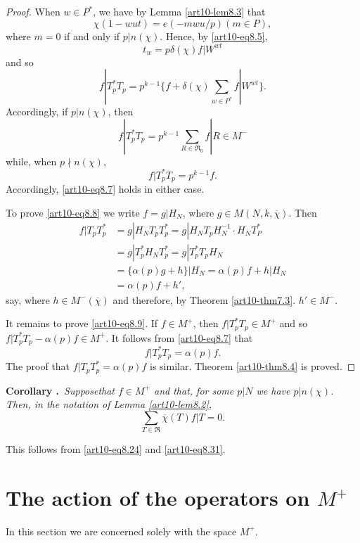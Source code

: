 \begin{proof}
When $w\in P^{*}$, we have by Lemma \ref{art10-lem8.3} that
$$
\chi(1-wut)=e(-mwu/p)(m\in P),
$$
where $m=0$ if and only if $p|n(\chi)$. Hence, by \eqref{art10-eq8.5},
$$
t_{w}=p\delta(\chi)f|W^{wt}
$$
and so
\begin{equation}
f|T^{*}_{p}T_{p}=p^{k-1}\{f+\delta(\chi)\sum\limits_{w\in P^{*}}f|W^{wt}\}.\label{art10-eq8.30}
\end{equation}
Accordingly, if $p|n(\chi)$, then
\begin{equation}
f|T^{*}_{p}T_{p}=p^{k-1}\sum\limits_{R\in \mathfrak{R}_{0}}f|R\in M^{-}\label{art10-eq8.31}
\end{equation}
while, when $p\nmid n(\chi)$,
\begin{equation}
f|T^{*}_{p}T_{p}=p^{k-1}f.\label{art10-eq8.32}
\end{equation}
Accordingly, \eqref{art10-eq8.7} holds in either case.

To prove \eqref{art10-eq8.8} we write $f=g|H_{N}$, where $g\in M(N,k,\overline{\chi})$. Then
\begin{align*}
f|T_{p}T^{*}_{p} &= g|H_{N}T_{p}T^{*}_{p}=g|H_{N}T_{p}H^{-1}_{N}\cdot H_{N}T^{*}_{P}\\
&= g|T^{*}_{p}H_{N}T^{*}_{p}=g|T^{*}_{p}T_{p}H_{N}\\
&= \{\alpha(p)g+h\}|H_{N}=\alpha(p)f+h|H_{N}\\
&= \alpha(p)f+h',
\end{align*}
say, where $h\in M^{-}(\overline{\chi})$ and therefore, by Theorem \ref{art10-thm7.3}. $h'\in M^{-}$.

It remains to prove \eqref{art10-eq8.9}. If $f\in M^{+}$, then $f|T^{*}_{p}T_{p}\in M^{+}$ and so $f|T^{*}_{p}T_{p}-\alpha(p)f\in M^{+}$. It follows from \eqref{art10-eq8.7} that
$$
f|T^{*}_{p}T_{p}=\alpha(p)f.
$$
The proof that $f|T_{p}T^{*}_{p}=\alpha(p)f$ is similar. Theorem \ref{art10-thm8.4} is proved.
\end{proof}

\medskip
\noindent
{\bf Corollary .\label{art10-coro8.5}}~{\em Suppose\pageoriginale that $f\in M^{+}$ and that, for some $p|N$ we have $p|n(\chi)$. Then, in the notation of Lemma \ref{art10-lem8.2},}
$$
\sum\limits_{T\in \mathfrak{R}}\overline{\chi}(T)f|T=0.
$$

This follows from \eqref{art10-eq8.24} and \eqref{art10-eq8.31}.

\section{The action of the operators on \texorpdfstring{$M^{+}$}{M+}}\label{art10-sec9}
In this section we are concerned solely with the space $M^{+}$.


